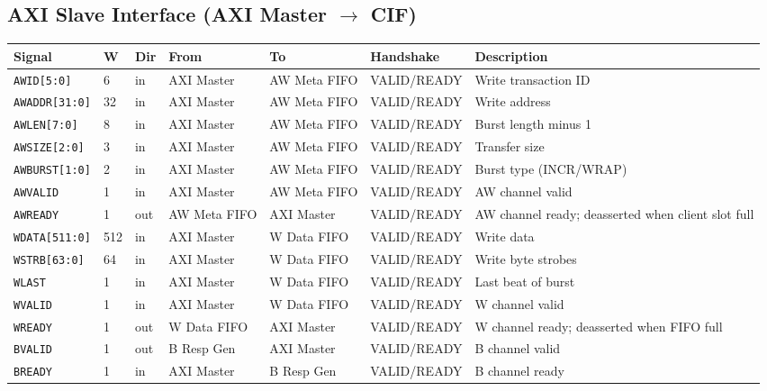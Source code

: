 \documentclass[11pt,a4paper]{article}
\begin{document}
\subsection{AXI Slave Interface (AXI Master $\rightarrow$ CIF)}
\begin{landscape}
\keepXColumns
\begin{tabularx}{\linewidth}{L{3.0cm} C{0.8cm} C{1.0cm} L{2.2cm} L{2.2cm} L{3.4cm} X}
\toprule
\textbf{Signal} & \textbf{W} & \textbf{Dir} & \textbf{From} & \textbf{To} & \textbf{Handshake} & \textbf{Description} \\
\midrule
\texttt{AWID[5:0]}     & 6   & in  & AXI Master & AW Meta FIFO & VALID/READY & Write transaction ID \\
\texttt{AWADDR[31:0]}  & 32  & in  & AXI Master & AW Meta FIFO & VALID/READY & Write address \\
\texttt{AWLEN[7:0]}    & 8   & in  & AXI Master & AW Meta FIFO & VALID/READY & Burst length minus 1 \\
\texttt{AWSIZE[2:0]}   & 3   & in  & AXI Master & AW Meta FIFO & VALID/READY & Transfer size \\
\texttt{AWBURST[1:0]}  & 2   & in  & AXI Master & AW Meta FIFO & VALID/READY & Burst type (INCR/WRAP) \\
\texttt{AWVALID}       & 1   & in  & AXI Master & AW Meta FIFO & VALID/READY & AW channel valid \\
\texttt{AWREADY}       & 1   & out & AW Meta FIFO & AXI Master  & VALID/READY & AW channel ready; deasserted when client slot full \\
\midrule
\texttt{WDATA[511:0]}  & 512 & in  & AXI Master & W Data FIFO  & VALID/READY & Write data \\
\texttt{WSTRB[63:0]}   & 64  & in  & AXI Master & W Data FIFO  & VALID/READY & Write byte strobes \\
\texttt{WLAST}         & 1   & in  & AXI Master & W Data FIFO  & VALID/READY & Last beat of burst \\
\texttt{WVALID}        & 1   & in  & AXI Master & W Data FIFO  & VALID/READY & W channel valid \\
\texttt{WREADY}        & 1   & out & W Data FIFO  & AXI Master  & VALID/READY & W channel ready; deasserted when FIFO full \\
\midrule
\texttt{BVALID}        & 1   & out & B Resp Gen  & AXI Master  & VALID/READY & B channel valid \\
\texttt{BREADY}        & 1   & in  & AXI Master  & B Resp Gen  & VALID/READY & B channel ready \\

\end{tabularx}
\end{landscape}
\end{document}
